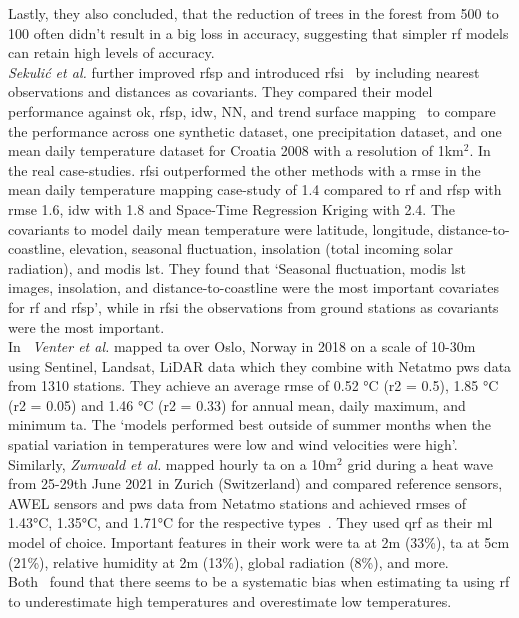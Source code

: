 Lastly, they also concluded, that the reduction of trees in the forest from 500 to 100 often didn't result in a big loss in accuracy, suggesting that simpler \gls{rf} models can retain high levels of accuracy.\\
\textit{Sekuli{\'c} et al.} further improved \gls{rfsp} and introduced \gls{rfsi}~\cite{sekulic2020random} by including nearest observations and distances as covariants. They compared their model performance against \gls{ok}, \gls{rfsp}, \gls{idw}, NN, and trend surface mapping~\cite{chorley1965trend} to compare the performance across one synthetic dataset, one precipitation dataset, and one mean daily temperature dataset for Croatia 2008 with a resolution of 1km$^2$. In the real case-studies. \gls{rfsi} outperformed the other methods with a \gls{rmse} in the mean daily temperature mapping case-study of 1.4 compared to \gls{rf} and \gls{rfsp} with \gls{rmse} 1.6, \gls{idw} with 1.8 and Space-Time Regression Kriging with 2.4. The covariants to model daily mean temperature were latitude, longitude, distance-to-coastline, elevation, seasonal fluctuation, insolation (total incoming solar radiation), and \gls{modis} \gls{lst}. They found that `Seasonal fluctuation, \gls{modis} \gls{lst} images, insolation, and distance-to-coastline were the most important covariates for \gls{rf} and \gls{rfsp}', while in \gls{rfsi} the observations from ground stations as covariants were the most important.\\
In~\cite{venter2020hyperlocal} \textit{Venter et al.} mapped \gls{ta} over Oslo, Norway in 2018 on a scale of 10-30m using Sentinel, Landsat, LiDAR data which they combine with Netatmo \gls{pws} data from 1310 stations. They achieve an average \gls{rmse} of 0.52 °C (\gls{r2} = 0.5), 1.85 °C (\gls{r2} = 0.05) and 1.46 °C (\gls{r2} = 0.33) for annual mean, daily maximum, and minimum \gls{ta}. The `models performed best outside of summer months when the spatial variation in temperatures were low and wind velocities were high'.\\
Similarly, \textit{Zumwald et al.} mapped hourly \gls{ta} on a 10m$^2$ grid during a heat wave from 25-29th June 2021 in Zurich (Switzerland) and compared reference sensors, AWEL sensors and \gls{pws} data from Netatmo stations and achieved \gls{rmse}s of 1.43°C, 1.35°C, and 1.71°C for the respective types~\cite{zumwald2021mapping}. They used \gls{qrf} as their \gls{ml} model of choice. Important features in their work were \gls{ta} at 2m (33\%), \gls{ta} at 5cm (21\%), relative humidity at 2m (13\%), global radiation (8\%), and more.\\
Both~\cite{zumwald2021mapping, zhang2012bias} found that there seems to be a systematic bias when estimating \gls{ta} using \gls{rf} to underestimate high temperatures and overestimate low temperatures.

